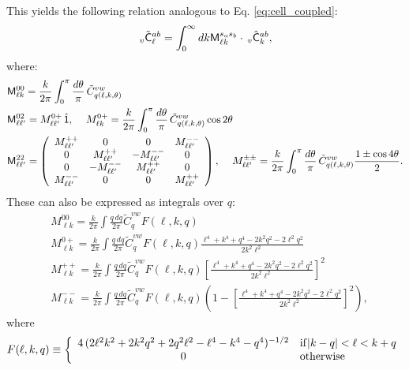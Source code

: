 \documentclass[a4paper,10pt]{article}
\begin{document}
    This yields the following relation analogous to Eq. \ref{eq:cell_coupled}:
    \begin{equation}
      \,_v\tilde{\sf C}^{ab}_\ell=\int_0^{\infty} dk {\sf M}^{s_as_b}_{\ell k}\cdot\,_v\hat{\sf C}^{ab}_k,
    \end{equation}
    where:
    \begin{align}
      &{\sf M}^{00}_{\ell k}=\frac{k}{2\pi}\int_0^\pi \frac{d\theta}{\pi}\,\tilde{C}^{vw}_{q(\ell,k,\theta)}\\
      &{\sf M}^{02}_{\ell\ell'}=M^{0+}_{\ell\ell'}\,\hat{\sf 1},
      \hspace{12pt}
      M^{0+}_{\ell k}=\frac{k}{2\pi}\int_0^\pi \frac{d\theta}{\pi}\,\tilde{C}^{vw}_{q(\ell,k,\theta)}\cos2\theta\\
      &{\sf M}^{22}_{\ell\ell'}=\left(
      \begin{array}{cccc}
        M^{++}_{\ell\ell'} &0 &0&M^{--}_{\ell\ell'}\\
        0&M^{++}_{\ell\ell'} &-M^{--}_{\ell\ell'}&0\\
        0&-M^{--}_{\ell\ell'} &M^{++}_{\ell\ell'}&0\\
        M^{--}_{\ell\ell'} &0 &0&M^{++}_{\ell\ell'}
      \end{array}\right),
      \hspace{12pt}M^{\pm\pm}_{\ell\ell'}=\frac{k}{2\pi}\int_0^\pi \frac{d\theta}{\pi}\,\tilde{C}^{vw}_{q(\ell,k,\theta)}\frac{1\pm\cos4\theta}{2}.
    \end{align}
    These can also be expressed as integrals over $q$:
    \begin{align}
      &M^{00}_{\ell k}=\frac{k}{2\pi}\int\frac{q\,dq}{2\pi}\tilde{C}^{vw}_qF(\ell,k,q)\\
      &M^{0+}_{\ell k}=\frac{k}{2\pi}\int\frac{q\,dq}{2\pi}\tilde{C}^{vw}_qF(\ell,k,q)\frac{\ell^4+k^4+q^4-2k^2q^2-2\ell^2q^2}{2k^2\ell^2}\\
      &M^{++}_{\ell k}=\frac{k}{2\pi}\int\frac{q\,dq}{2\pi}\tilde{C}^{vw}_qF(\ell,k,q)\left[\frac{\ell^4+k^4+q^4-2k^2q^2-2\ell^2q^2}{2k^2\ell^2}\right]^2\\
      &M^{--}_{\ell k}=\frac{k}{2\pi}\int\frac{q\,dq}{2\pi}\tilde{C}^{vw}_qF(\ell,k,q)\left(1-\left[\frac{\ell^4+k^4+q^4-2k^2q^2-2\ell^2q^2}{2k^2\ell^2}\right]^2\right),
    \end{align}
    where
    \begin{equation}
     F(\ell,k,q)\equiv\left\{
          \begin{array}{cl}
            4\,(2\ell^2k^2+2k^2q^2+2q^2\ell^2-\ell^4-k^4-q^4)^{-1/2} & {\rm if} |k-q|<\ell<k+q\\
            0 & {\rm otherwise}
          \end{array}\right.
    \end{equation}
    
\end{document}
